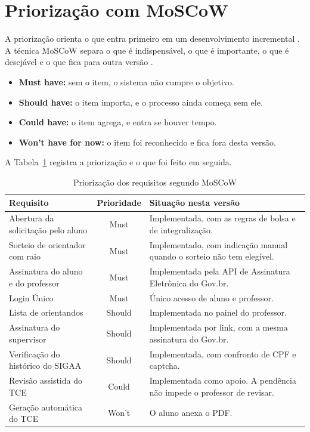 \section{Priorização com MoSCoW}

A priorização orienta o que entra primeiro em um desenvolvimento incremental \cite{somerville2011engenharia}. A técnica MoSCoW separa o que é indispensável, o que é importante, o que é desejável e o que fica para outra versão \cite{clegg1994moscow}.

\begin{itemize}
    \item \textbf{Must have:} sem o item, o sistema não cumpre o objetivo.
    \item \textbf{Should have:} o item importa, e o processo ainda começa sem ele.
    \item \textbf{Could have:} o item agrega, e entra se houver tempo.
    \item \textbf{Won't have for now:} o item foi reconhecido e fica fora desta versão.
\end{itemize}

A Tabela~\ref{tab:priorizacao} registra a priorização e o que foi feito em seguida.

\begin{table}[H]
\centering
\caption{Priorização dos requisitos segundo MoSCoW}
\label{tab:priorizacao}
\begin{tabular}{|p{5.2cm}|c|p{6.4cm}|}
\hline
\textbf{Requisito} & \textbf{Prioridade} & \textbf{Situação nesta versão} \\
\hline
Abertura da solicitação pelo aluno & Must & Implementada, com as regras de bolsa e de integralização. \\
\hline
Sorteio de orientador com raio & Must & Implementado, com indicação manual quando o sorteio não tem elegível. \\
\hline
Assinatura do aluno e do professor & Must & Implementada pela API de Assinatura Eletrônica do Gov.br. \\
\hline
Login Único & Must & Único acesso de aluno e professor. \\
\hline
Lista de orientandos & Should & Implementada no painel do professor. \\
\hline
Assinatura do supervisor & Should & Implementada por link, com a mesma assinatura do Gov.br. \\
\hline
Verificação do histórico do SIGAA & Should & Implementada, com confronto de CPF e captcha. \\
\hline
Revisão assistida do TCE & Could & Implementada como apoio. A pendência não impede o professor de revisar. \\
\hline
Geração automática do TCE & Won't & O aluno anexa o PDF. \\
\hline
\end{tabular}
\end{table}

